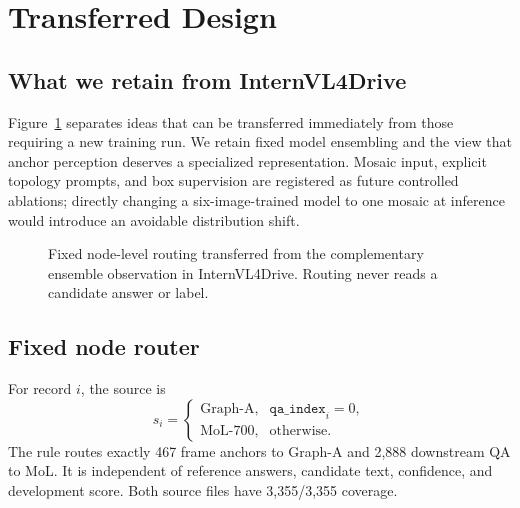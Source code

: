 \documentclass[10pt,twocolumn]{article}
\begin{document}
\section{Transferred Design}
\subsection{What we retain from InternVL4Drive}
Figure~\ref{fig:transfer} separates ideas that can be transferred immediately
from those requiring a new training run. We retain fixed model ensembling and
the view that anchor perception deserves a specialized representation. Mosaic
input, explicit topology prompts, and box supervision are registered as future
controlled ablations; directly changing a six-image-trained model to one mosaic
at inference would introduce an avoidable distribution shift.

\begin{figure}[t]
\centering
{}
\caption{Fixed node-level routing transferred from the complementary ensemble
observation in InternVL4Drive. Routing never reads a candidate answer or label.}
\label{fig:transfer}
\end{figure}

\subsection{Fixed node router}
For record $i$, the source is
\begin{equation}
s_i=\begin{cases}
\text{Graph-A}, & \texttt{qa\_index}_i=0,\\
\text{MoL-700}, & \text{otherwise}.
\end{cases}
\end{equation}
The rule routes exactly 467 frame anchors to Graph-A and 2,888 downstream QA
to MoL. It is independent of reference answers, candidate text, confidence,
and development score. Both source files have 3,355/3,355 coverage.
\end{document}
